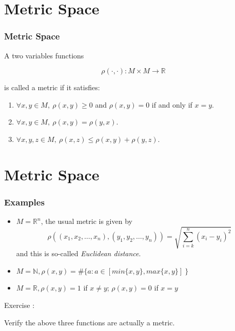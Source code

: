\documentclass[12pt, t]{beamer}
\renewcommand{\emph}[1]{{\color{Turquoise3}\textsl{#1}}}
\begin{document}
\section{Metric Space}
\begin{frame}
    \frametitle{Metric Space}
A two variables functions 

\begin{equation*}
    \rho(\cdot,\cdot):M\times M \rightarrow \mathbb{R}
\end{equation*}

is called a metric if it satisfies:

\begin{enumerate}
    \item $\forall x,y\in M,\ \rho (x,y) \geq 0$ and $\rho (x,y)=0$ if and only if $x=y$.
    \item  $\forall x,y\in M,\ \rho (x,y)=\rho (y,x)$.
    \item  $\forall x,y,z\in M,\ \rho (x,z)\leq \rho (x,y)+\rho (y,z)$.
\end{enumerate}


\end{frame}

\section{Metric Space}
\begin{frame}
    \frametitle{Examples}
\begin{itemize}
    \item $M=\mathbb{R}^n$, the usual metric is given by 
        \begin{equation*}
            \rho ( (x_1,x_2,\dots,x_n), (y_1,y_2,\dots,y_n)) = \sqrt{\sum^{n}_{i=k}(x_i-y_i)^2 }
        \end{equation*} 
        and this is so-called \emph{Euclidean distance}.
    \item $M=\mathbb{N}, \rho(x,y)= \#\{ a:a\in [min\{x,y\},max\{x,y\}]\ \} $
    \item $M=\mathbb{R},\rho (x,y)=1 $ if $x\neq y$; $\rho (x,y)=0$ if $x=y$
\end{itemize}
\vspace{1em}
Exercise : \\
\begin{center}
    Verify the above three functions are actually a metric.
\end{center}
\end{frame}
\end{document}
